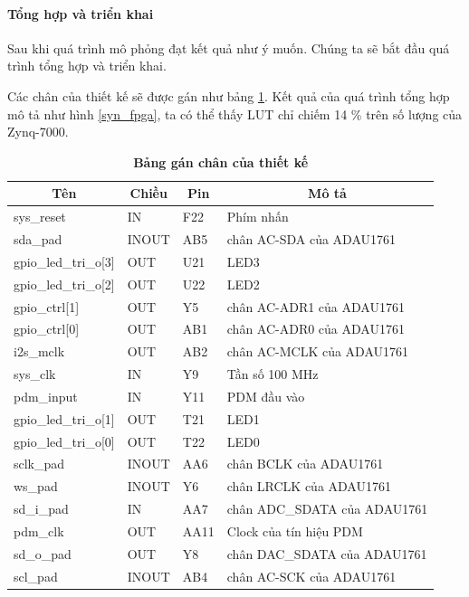 \paragraph{Tổng hợp và triển khai}

Sau khi quá trình mô phỏng đạt kết quả như ý muốn. Chúng ta sẽ bắt đầu quá trình tổng hợp và triển khai.

Các chân của thiết kế sẽ được gán như bảng \ref{constraint}. Kết quả của quá trình tổng hợp mô tả như hình \ref{syn_fpga}, ta có thể thấy LUT chỉ chiếm 14 \% trên số lượng của Zynq-7000.

\begin{table}[H]
\centering
    \caption[Bảng gán chân của thiết kế]{\bfseries \fontsize{12pt}{0pt}\selectfont Bảng gán chân của thiết kế}
   \begin{tabular}{|l|l|l|l|}
\hline
\multicolumn{1}{|c|}{\textbf{Tên}} & \multicolumn{1}{c|}{\textbf{Chiều}} & \multicolumn{1}{c|}{\textbf{Pin}} & \multicolumn{1}{c|}{\textbf{Mô tả}} \\ \hline
sys\_reset               & IN    & F22  & Phím nhấn                    \\ \hline
sda\_pad                 & INOUT & AB5  & chân AC-SDA của ADAU1761     \\ \hline
gpio\_led\_tri\_o{[}3{]} & OUT   & U21  & LED3                         \\ \hline
gpio\_led\_tri\_o{[}2{]} & OUT   & U22  & LED2                         \\ \hline
gpio\_ctrl{[}1{]}        & OUT   & Y5   & chân AC-ADR1 của ADAU1761    \\ \hline
gpio\_ctrl{[}0{]}        & OUT   & AB1  & chân AC-ADR0 của ADAU1761    \\ \hline
i2s\_mclk                & OUT   & AB2  & chân AC-MCLK của ADAU1761    \\ \hline
sys\_clk                 & IN    & Y9   & Tần số 100 MHz               \\ \hline
pdm\_input               & IN    & Y11  & PDM đầu vào                  \\ \hline
gpio\_led\_tri\_o{[}1{]} & OUT   & T21  & LED1                         \\ \hline
gpio\_led\_tri\_o{[}0{]} & OUT   & T22  & LED0                         \\ \hline
sclk\_pad                & INOUT & AA6  & chân BCLK của ADAU1761       \\ \hline
ws\_pad                  & INOUT & Y6   & chân LRCLK của ADAU1761      \\ \hline
sd\_i\_pad               & IN    & AA7  & chân ADC\_SDATA của ADAU1761 \\ \hline
pdm\_clk                 & OUT   & AA11 & Clock của tín hiệu PDM       \\ \hline
sd\_o\_pad               & OUT   & Y8   & chân DAC\_SDATA của ADAU1761 \\ \hline
scl\_pad                 & INOUT & AB4  & chân AC-SCK của ADAU1761     \\ \hline
\end{tabular}
    \label{constraint}
\end{table}


